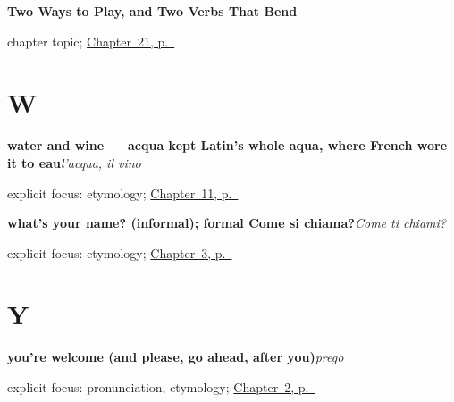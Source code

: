 \noindent\begin{minipage}[t]{\linewidth}
\raggedright
\textbf{Two Ways to Play, and Two Verbs That Bend}\par
\footnotesize chapter topic; \hyperref[ch:it-play-get-answer]{Chapter~21, p.~\pageref*{ch:it-play-get-answer}}
\end{minipage}\par\smallskip

\section*{W}

\noindent\begin{minipage}[t]{\linewidth}
\raggedright
\textbf{water and wine — acqua kept Latin's whole aqua, where French wore it to eau}\enspace\emph{l'acqua, il vino}\par
\footnotesize explicit focus: etymology; \hyperref[ch:it-bread-water-wine]{Chapter~11, p.~\pageref*{ch:it-bread-water-wine}}
\end{minipage}\par\smallskip

\noindent\begin{minipage}[t]{\linewidth}
\raggedright
\textbf{what's your name? (informal); formal Come si chiama?}\enspace\emph{Come ti chiami?}\par
\footnotesize explicit focus: etymology; \hyperref[ch:it-introductions]{Chapter~3, p.~\pageref*{ch:it-introductions}}
\end{minipage}\par\smallskip

\section*{Y}

\noindent\begin{minipage}[t]{\linewidth}
\raggedright
\textbf{you're welcome (and please, go ahead, after you)}\enspace\emph{prego}\par
\footnotesize explicit focus: pronunciation, etymology; \hyperref[ch:it-how-are-you]{Chapter~2, p.~\pageref*{ch:it-how-are-you}}
\end{minipage}\par\smallskip
